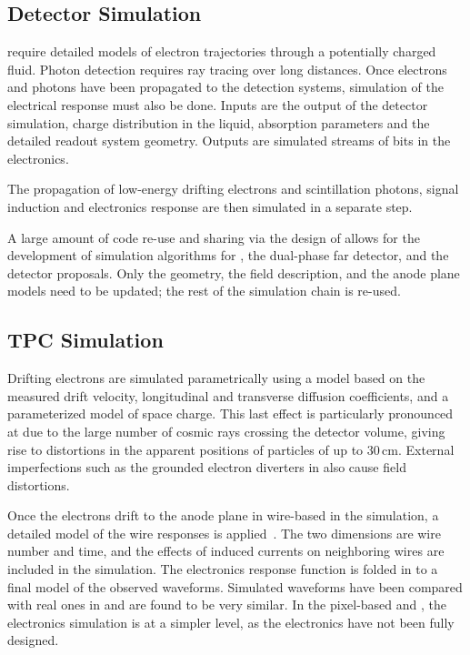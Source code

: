 \documentclass[../main-v1.tex]{subfiles}
\begin{document}
\subsection{Detector Simulation}
 require detailed models of electron trajectories through a potentially charged fluid.  Photon detection requires ray tracing over long distances.  Once electrons and photons have been propagated to the detection systems, simulation of the electrical response must also be done. Inputs are the output of the detector simulation, charge distribution in the liquid, absorption parameters and the detailed readout system geometry. Outputs are simulated streams of bits in the electronics. 

The propagation of low-energy drifting electrons and scintillation photons, signal induction  and electronics response are then simulated in a separate step.  

A large amount of code re-use and sharing via the design of  allows for the development of simulation algorithms for , the dual-phase far detector, 
and the  detector proposals.  Only the geometry, the field description, and the anode plane models need to be updated; the rest of the simulation chain is re-used.

\subsection{TPC Simulation}

Drifting electrons are simulated parametrically using a model based on the measured drift velocity, longitudinal and transverse diffusion coefficients, and a parameterized model of space charge.  This last effect is particularly pronounced at  due to the large number of cosmic rays crossing the detector volume, giving rise to distortions in the apparent positions of particles of up to 30\,cm.  %
External imperfections such as the grounded electron diverters in  also cause field distortions.

Once the electrons drift to the anode plane in wire-based  in the simulation, a detailed \twod model of the wire responses is applied~\cite{Abi:2020mwi}.  The two dimensions are wire number and time, and the effects of induced currents on neighboring wires are included in the simulation.  The electronics response function is folded in to a final model of the observed waveforms.  Simulated waveforms have been compared with real ones  in  and are found to be very similar.
In the pixel-based  and , the electronics simulation is at a simpler level, as the electronics have not been fully designed.
\end{document}
